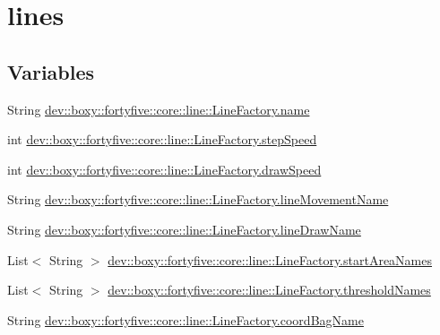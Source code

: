 \hypertarget{group__lines}{
\section{lines}
\label{db/df8/group__lines}
}
\subsection*{Variables}
\begin{DoxyCompactItemize}
\item 
String \hyperlink{group__lines_ga9ed595e6ac26025b9e2826cc195327c1}{dev::boxy::fortyfive::core::line::LineFactory.name}
\item 
int \hyperlink{group__lines_gab7c2eccacb6d52fab1529bbec2d2c314}{dev::boxy::fortyfive::core::line::LineFactory.stepSpeed}
\item 
int \hyperlink{group__lines_ga7bd2106bc26ec2589e14ed6e60f60c35}{dev::boxy::fortyfive::core::line::LineFactory.drawSpeed}
\item 
String \hyperlink{group__lines_ga4b63112d92793b6d05a8a2c2a847ebd0}{dev::boxy::fortyfive::core::line::LineFactory.lineMovementName}
\item 
String \hyperlink{group__lines_ga08b877628c04bbe9a6996ad72ca0e999}{dev::boxy::fortyfive::core::line::LineFactory.lineDrawName}
\item 
List$<$ String $>$ \hyperlink{group__lines_gaaef9f97a8fb5932bba9333942aba8e6a}{dev::boxy::fortyfive::core::line::LineFactory.startAreaNames}
\item 
List$<$ String $>$ \hyperlink{group__lines_ga9599963728730f344f357a1c9e104551}{dev::boxy::fortyfive::core::line::LineFactory.thresholdNames}
\item 
String \hyperlink{group__lines_ga969981925a8234168adae9c55eeb6a1a}{dev::boxy::fortyfive::core::line::LineFactory.coordBagName}
\end{DoxyCompactItemize}



